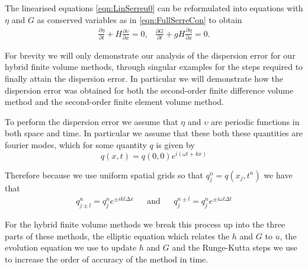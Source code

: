 The linearised equations \eqref{eqn:LinSerreu0} can be reformulated into equations with $\eta$ and $G$ as conserved variables as in \eqref{eqn:FullSerreCon} to obtain
\begin{subequations}
	\begin{gather}
	\label{eqn:LinContG}
	\frac{\partial  \eta}{\partial  t} + H\frac{\partial  \upsilon}{\partial  x} = 0,
	\end{gather}
	
	\begin{gather}
	\label{eqn:LineMomeG}
	\frac{\partial  G}{\partial  t} + g H \frac{\partial  \eta}{\partial  x}  = 0.
	\end{gather}
	\label{eqn:LinSerreG}	
\end{subequations}

For brevity we will only demonstrate our analysis of the dispersion error for our hybrid finite volume methods, through singular examples for the steps required to finally attain the dispersion error. In particular we will demonstrate how the dispersion error was obtained for both the second-order finite difference volume method and the second-order finite element volume method. 

To perform the dispersion error we assume that $\eta$ and $\upsilon$ are periodic functions in both space and time. In particular we assume that these both these quantities are fourier modes, which for some quantity $q$ is given by
\begin{equation}
q(x,t) = q(0,0) e^{i\left(\omega t + kx\right)}
\label{eqn:FourierNode}
\end{equation}


Therefore because we use uniform spatial grids so that $q^n_j = q(x_j,t^n)$  we have that
\begin{align}
q^{n}_{j \pm l} = q^n_j e^{\pm ik l\Delta x} & & \text{and} & & q^{n \pm l}_{j} = q^n_j e^{\pm i \omega l\Delta t}
\label{eqn:fourierfactor}
\end{align}



For the hybrid finite volume methods we break this process up into the three parts of these methods, the elliptic equation which relates the $h$ and $G$ to $u$, the evolution equation we use to update $h$ and $G$ and the Runge-Kutta steps we use to increase the order of accuracy of the method in time. 

